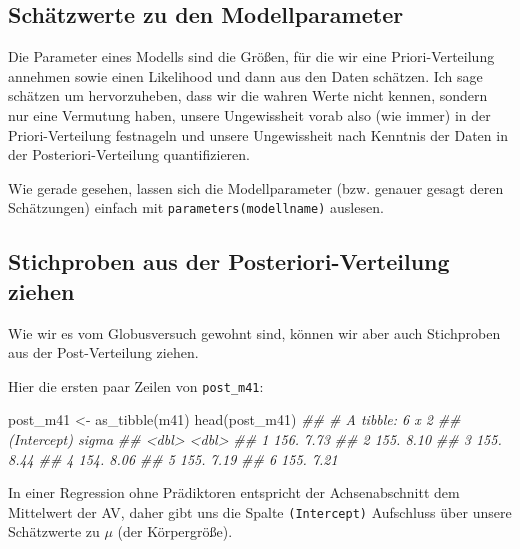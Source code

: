 \documentclass[
  a4paper,
  DIV=11]{scrreprt}
\newenvironment{Shaded}{\begin{snugshade}}{\end{snugshade}}
\newcommand{\DocumentationTok}[1]{\textcolor[rgb]{0.37,0.37,0.37}{\textit{#1}}}
\newcommand{\FunctionTok}[1]{\textcolor[rgb]{0.28,0.35,0.67}{#1}}
\newcommand{\NormalTok}[1]{\textcolor[rgb]{0.00,0.23,0.31}{#1}}
\newcommand{\OtherTok}[1]{\textcolor[rgb]{0.00,0.23,0.31}{#1}}
\theoremstyle{definition}
\theoremstyle{remark}
\begin{document}
\hypertarget{schuxe4tzwerte-zu-den-modellparameter}{%
\subsection{Schätzwerte zu den
Modellparameter}\label{schuxe4tzwerte-zu-den-modellparameter}}

Die Parameter eines Modells sind die Größen, für die wir eine
Priori-Verteilung annehmen sowie einen Likelihood und dann aus den Daten
schätzen. Ich sage schätzen um hervorzuheben, dass wir die wahren Werte
nicht kennen, sondern nur eine Vermutung haben, unsere Ungewissheit
vorab also (wie immer) in der Priori-Verteilung festnageln und unsere
Ungewissheit nach Kenntnis der Daten in der Posteriori-Verteilung
quantifizieren.

Wie gerade gesehen, lassen sich die Modellparameter (bzw. genauer gesagt
deren Schätzungen) einfach mit \texttt{parameters(modellname)} auslesen.

\hypertarget{stichproben-aus-der-posteriori-verteilung-ziehen}{%
\subsection{Stichproben aus der Posteriori-Verteilung
ziehen}\label{stichproben-aus-der-posteriori-verteilung-ziehen}}

Wie wir es vom Globusversuch gewohnt sind, können wir aber auch
Stichproben aus der Post-Verteilung ziehen.

Hier die ersten paar Zeilen von \texttt{post\_m41}:

\begin{Shaded}
\begin{Highlighting}[]
\NormalTok{post\_m41 }\OtherTok{\textless{}{-}} \FunctionTok{as\_tibble}\NormalTok{(m41)}
\FunctionTok{head}\NormalTok{(post\_m41)}
\DocumentationTok{\#\# \# A tibble: 6 x 2}
\DocumentationTok{\#\#   \textasciigrave{}(Intercept)\textasciigrave{} sigma}
\DocumentationTok{\#\#           \textless{}dbl\textgreater{} \textless{}dbl\textgreater{}}
\DocumentationTok{\#\# 1          156.  7.73}
\DocumentationTok{\#\# 2          155.  8.10}
\DocumentationTok{\#\# 3          155.  8.44}
\DocumentationTok{\#\# 4          154.  8.06}
\DocumentationTok{\#\# 5          155.  7.19}
\DocumentationTok{\#\# 6          155.  7.21}
\end{Highlighting}
\end{Shaded}

In einer Regression ohne Prädiktoren entspricht der Achsenabschnitt dem
Mittelwert der AV, daher gibt uns die Spalte \texttt{(Intercept)}
Aufschluss über unsere Schätzwerte zu \(\mu\) (der Körpergröße).
\end{document}
